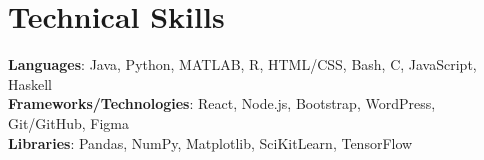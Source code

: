 \section{Technical Skills}
 \begin{itemize}[leftmargin=0.15in, label={}]
    \small{\item{
     \textbf{Languages}{: Java, Python, MATLAB, R, HTML/CSS, Bash, C, JavaScript, Haskell} \\
     \textbf{Frameworks/Technologies}{: React, Node.js, Bootstrap, WordPress, Git/GitHub, Figma} \\
     \textbf{Libraries}{: Pandas, NumPy, Matplotlib, SciKitLearn, TensorFlow}
    }}
 \end{itemize}